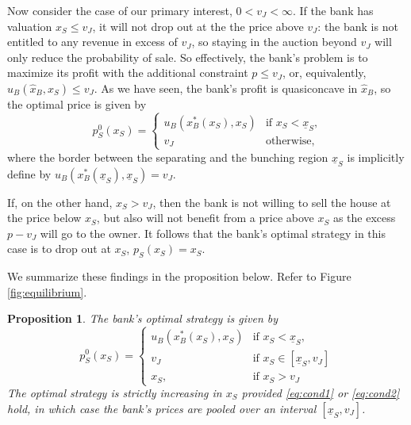 \documentclass[11pt,twopage]{article}
\newcommand{\ul}{\underline}
\newtheorem{proposition}{Proposition}
{\bf}{\it}
\begin{document}
Now consider the case of our primary interest, $0<v_J<\infty$. If the bank has valuation $x_S \leq v_J$, it will not drop out at the the price above $v_J$: the bank is not entitled to any revenue in excess of $v_J$, so staying in the auction beyond $v_J$ will only reduce the probability of sale. So effectively, the bank's problem is to maximize its profit with the additional constraint $p \leq v_J$, or, equivalently, $u_B(\hat x_B,x_S) \leq v_J$. As we have seen, the bank's profit is quasiconcave in $\hat x_B$, so the optimal price is given by 
\[ 
p_S^0(x_S)= \begin{cases}
u_B(x_B^*(x_S),x_S) & \text{if $x_S<\ul x_S$,} \\
v_J & \text{otherwise,}
\end{cases}
\]
where the border between the separating and the bunching region $\ul x_S$ is implicitly define by $u_B(x_B^*(\ul x_S),\ul x_S)=v_J$.

If, on the other hand, $x_S>v_J$, then the bank is not willing to sell the house at the price below $x_S$, but also will not benefit from a price above $x_S$ as the excess $p - v_J$ will go to the owner. It follows that the bank's optimal strategy in this case is to drop out at $x_S$,  $p_S(x_S) = x_S$. 

We summarize these findings in the proposition below. Refer to Figure \ref{fig:equilibrium}.
\begin{proposition}\label{prop:syminfo}
The bank's optimal strategy is given by 
\[ p_S^0(x_S) = 
\begin{cases}
u_B(x_B^*(x_S),x_S) & \text{if $x_S<\ul x_S$,} \\
v_J & \text{if $x_S\in[\ul x_S,v_J]$} \\
x_S, & \text{if $x_S > v_J$}
\end{cases}
\]
The optimal strategy is strictly increasing in $x_S$ provided \eqref{eq:cond1} or \eqref{eq:cond2} hold, in which case the bank's prices are pooled over an interval $[\underline x_S, v_J]$.
\end{proposition}
 
\end{document}
